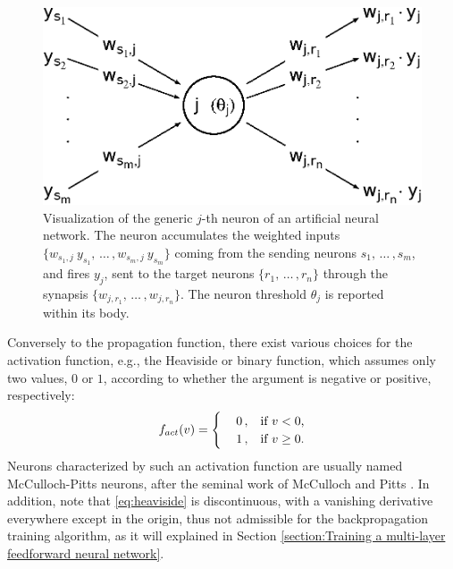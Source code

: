 \documentclass[12pt, a4paper, twoside, openright, notitlepage]{report}
\numberwithin{equation}{chapter}
\theoremstyle{theorem}
\theoremstyle{definition}
\theoremstyle{remark}
\theoremstyle{proposition}
\numberwithin{figure}{chapter}
\begin{document}
		\begin{figure}[t]
			\center
			\includegraphics[scale = 0.6]{neural_model_ter.eps}
			
			\caption{Visualization of the generic $j$-th neuron of an artificial neural network. The neuron accumulates the weighted inputs $\big\lbrace w_{s_1,j} ~ y_{s_1}, \, \ldots \, , w_{s_m,j} ~ y_{s_m} \big\rbrace$ coming from the sending neurons $s_1, \, \ldots \, , s_m$, and fires $y_j$, sent to the target neurons $\big\lbrace r_1, \, \ldots \, , r_n \big\rbrace$ through the synapsis $\big\lbrace w_{j,r_1}, \, \ldots \, , w_{j,r_n} \big\rbrace$. The neuron threshold $\theta_j$ is reported within its body.} 
			\label{fig:neural-model}
		\end{figure}
		
		Conversely to the propagation function, there exist various choices for the activation function, e.g., the Heaviside or binary function, which assumes only two values, $0$ or $1$, according to whether the argument is negative or positive, respectively:
		\begin{equation}
			\label{eq:heaviside}
			f_{act}(v) = 
			\begin{cases}
				& 0 \, , \hspace*{0.3cm} \text{if $v < 0$,} \\
				& 1 \, , \hspace*{0.3cm} \text{if $v \geq 0$.}
			\end{cases}
		\end{equation}
		Neurons characterized by such an activation function are usually named McCulloch-Pitts neurons, after the seminal work of McCulloch and Pitts \cite{Hay05}. In addition, note that \eqref{eq:heaviside} is discontinuous, with a vanishing derivative everywhere except in the origin, thus not admissible for the backpropagation training algorithm, as it will explained in Section \ref{section:Training a multi-layer feedforward neural network}. 
		
\end{document}
